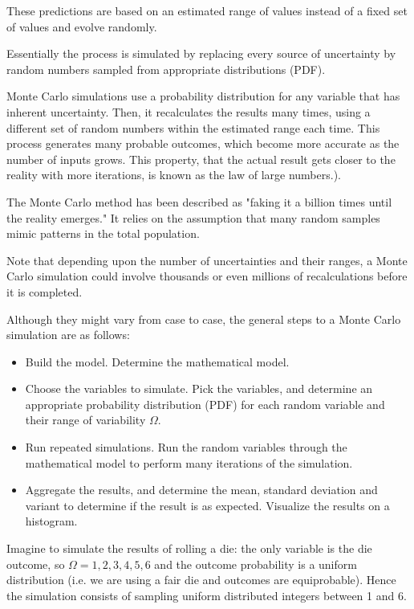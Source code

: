 \documentclass[12pt,a4paper]{book}
\begin{document}
These predictions are based on an estimated range of values instead of a fixed set of values and evolve randomly.

Essentially the process is simulated by replacing every source of uncertainty by random numbers sampled from appropriate distributions (PDF). 

Monte Carlo simulations use a probability distribution for any variable that has inherent uncertainty. Then, it recalculates the results many times, using a different set of random numbers within the estimated range each time. This process generates many probable outcomes, which become more accurate as the number of inputs grows. This property, that the actual result gets closer to the reality with more iterations, is known as the law of large numbers.).

The Monte Carlo method has been described as "faking it a billion times until the reality emerges."
It relies on the assumption that many random samples mimic patterns in the total population.

Note that depending upon the number of uncertainties and their ranges, a Monte Carlo simulation could involve thousands or even millions of recalculations before it is completed.

Although they might vary from case to case, the general steps to a Monte Carlo simulation are as follows:
\begin{itemize}
\item Build the model. Determine the mathematical model.
\item Choose the variables to simulate. Pick the variables, and determine an appropriate probability distribution (PDF) for each random variable and their range of variability $\Omega$.
\item Run repeated simulations. Run the random variables through the mathematical model to perform many iterations of the simulation.
\item Aggregate the results, and determine the mean, standard deviation and variant to determine if the result is as expected. Visualize the results on a histogram.
\end{itemize}

Imagine to simulate the results of rolling a die: the only variable is the die outcome, so $\Omega =1,2,3,4,5,6$ and the outcome probability is a uniform distribution (i.e. we are using a fair die and outcomes are equiprobable). Hence the simulation consists of sampling uniform distributed integers between 1 and 6.
\end{document}

